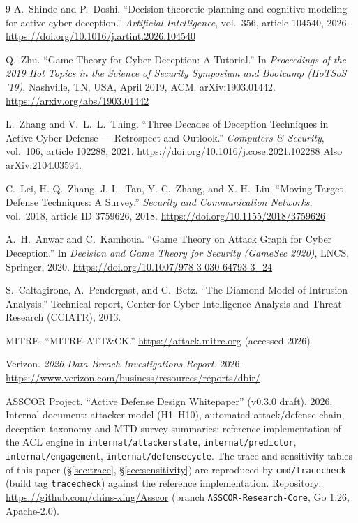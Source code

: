 \documentclass[11pt]{article}
\begin{document}
\small
\begin{thebibliography}{9}
A.~Shinde and P.~Doshi.
``Decision-theoretic planning and cognitive modeling for active cyber
deception.''
\textit{Artificial Intelligence}, vol.~356, article 104540, 2026.
\url{https://doi.org/10.1016/j.artint.2026.104540}

Q.~Zhu.
``Game Theory for Cyber Deception: A Tutorial.''
In \textit{Proceedings of the 2019 Hot Topics in the Science of Security
Symposium and Bootcamp (HoTSoS '19)}, Nashville, TN, USA, April 2019, ACM.
arXiv:1903.01442.
\url{https://arxiv.org/abs/1903.01442}

L.~Zhang and V.~L.~L.~Thing.
``Three Decades of Deception Techniques in Active Cyber Defense ---
Retrospect and Outlook.''
\textit{Computers \& Security}, vol.~106, article 102288, 2021.
\url{https://doi.org/10.1016/j.cose.2021.102288}
Also arXiv:2104.03594.

C.~Lei, H.-Q.~Zhang, J.-L.~Tan, Y.-C.~Zhang, and X.-H.~Liu.
``Moving Target Defense Techniques: A Survey.''
\textit{Security and Communication Networks}, vol.~2018, article ID
3759626, 2018.
\url{https://doi.org/10.1155/2018/3759626}

A.~H.~Anwar and C.~Kamhoua.
``Game Theory on Attack Graph for Cyber Deception.''
In \textit{Decision and Game Theory for Security (GameSec 2020)}, LNCS,
Springer, 2020.
\url{https://doi.org/10.1007/978-3-030-64793-3_24}

S.~Caltagirone, A.~Pendergast, and C.~Betz.
``The Diamond Model of Intrusion Analysis.''
Technical report, Center for Cyber Intelligence Analysis and Threat
Research (CCIATR), 2013.

MITRE.
``MITRE ATT\&CK.''
\url{https://attack.mitre.org} (accessed 2026)

Verizon.
\textit{2026 Data Breach Investigations Report.}
2026.
\url{https://www.verizon.com/business/resources/reports/dbir/}

ASSCOR Project.
``Active Defense Design Whitepaper'' (v0.3.0 draft), 2026.
Internal document: attacker model (H1--H10), automated attack/defense
chain, deception taxonomy and MTD survey summaries; reference
implementation of the ACL engine in \texttt{internal/attackerstate},
\texttt{internal/predictor}, \texttt{internal/engagement},
\texttt{internal/defensecycle}. The trace and sensitivity tables of this
paper (\S\ref{sec:trace}, \S\ref{sec:sensitivity}) are reproduced by
\texttt{cmd/tracecheck} (build tag \texttt{tracecheck}) against the
reference implementation. Repository:
\url{https://github.com/chins-xing/Asscor} (branch
\texttt{ASSCOR-Research-Core}, Go 1.26, Apache-2.0).
\end{thebibliography}
\normalsize
\end{document}
